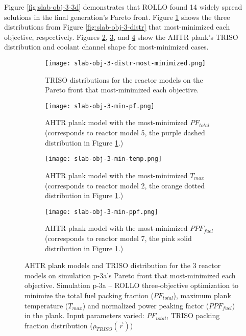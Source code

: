Figure \ref{fig:slab-obj-3-3d} demonstrates that \gls{ROLLO} found 14 widely spread 
solutions in the final generation's Pareto front.  
Figure \ref{fig:slab-obj-3-distr-most-minimized} shows the three distributions from 
Figure \ref{fig:slab-obj-3-distr} that most-minimized each objective, respectively. 
Figures \ref{fig:slab-obj-3-min-pf}, \ref{fig:slab-obj-3-min-temp}, and 
\ref{fig:slab-obj-3-min-ppf} show the \gls{AHTR} plank's TRISO distribution and 
coolant channel shape for most-minimized cases. 
\begin{figure}[htbp!]
    \centering
    \begin{subfigure}{0.85\textwidth}
        \texttt{[image: slab-obj-3-distr-most-minimized.png]}
        \caption{TRISO distributions for the reactor models on the Pareto front
        that most-minimized each objective.}
        \label{fig:slab-obj-3-distr-most-minimized}
    \end{subfigure}
    \begin{subfigure}{0.8\textwidth}
        \texttt{[image: slab-obj-3-min-pf.png]}
        \caption{\gls{AHTR} plank model with the most-minimized $PF_{total}$ 
        (corresponds to reactor model 5, the purple dashed distribution in 
        Figure \ref{fig:slab-obj-3-distr-most-minimized}.)}
        \label{fig:slab-obj-3-min-pf} 
    \end{subfigure}
    \begin{subfigure}{0.8\textwidth}
        \texttt{[image: slab-obj-3-min-temp.png]}
        \caption{\gls{AHTR} plank model with the most-minimized $T_{max}$
        (corresponds to reactor model 2, the orange dotted distribution in
        Figure \ref{fig:slab-obj-3-distr-most-minimized}.)}
        \label{fig:slab-obj-3-min-temp} 
    \end{subfigure}
    \begin{subfigure}{0.8\textwidth}
        \texttt{[image: slab-obj-3-min-ppf.png]}
        \caption{\gls{AHTR} plank model with the most-minimized $PPF_{fuel}$
        (corresponds to reactor model 7, the pink solid distribution in
        Figure \ref{fig:slab-obj-3-distr-most-minimized}.)}
        \label{fig:slab-obj-3-min-ppf} 
    \end{subfigure}
    \caption{AHTR plank models and TRISO distribution for the 3 reactor models on 
    simulation p-3a's Pareto front that most-minimized each objective.
    Simulation p-3a -- ROLLO three-objective optimization to minimize the total fuel 
    packing fraction ($PF_{total}$), maximum plank temperature ($T_{max}$) and 
    normalized power peaking factor ($PPF_{fuel}$) in the plank. 
    Input parameters varied: $PF_{total}$, TRISO packing fraction distribution
    ($\rho_{TRISO}(\vec{r})$)}
    \label{fig:slab-obj-3-most-minimized}
\end{figure}

